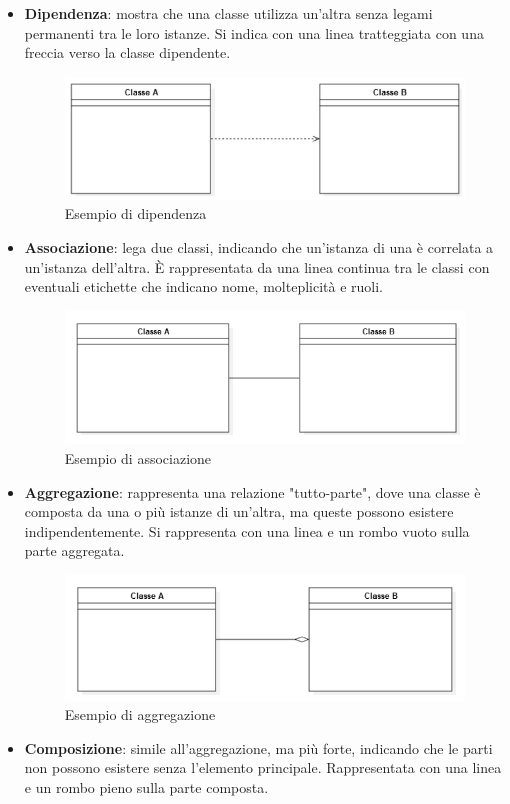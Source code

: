 \begin{itemize}
    \item \textbf{Dipendenza}: mostra che una classe utilizza un'altra senza legami permanenti tra le loro istanze. Si indica con una linea tratteggiata con una freccia verso la classe dipendente.
    \begin{figure}[H]
        \centering
        \includegraphics[width=0.5\linewidth]{../../../img/dipendenza_classi.png}
        \caption{Esempio di dipendenza}
        \label{fig:dipendeza_classi}
    \end{figure}
    \item \textbf{Associazione}: lega due classi, indicando che un'istanza di una è correlata a un'istanza dell'altra. È rappresentata da una linea continua tra le classi con eventuali etichette che indicano nome, molteplicità e ruoli.
    \begin{figure}[H]
        \centering
        \includegraphics[width=0.5\linewidth]{../../../img/associazione_classi.png}
        \caption{Esempio di associazione}
        \label{fig:associazione_classi}
    \end{figure}
    \item \textbf{Aggregazione}: rappresenta una relazione "tutto-parte", dove una classe è composta da una o più istanze di un'altra, ma queste possono esistere indipendentemente. Si rappresenta con una linea e un rombo vuoto sulla parte aggregata.
    \begin{figure}[H]
        \centering
        \includegraphics[width=0.5\linewidth]{../../../img/aggregazione_classi.png}
        \caption{Esempio di aggregazione}
        \label{fig:aggregazione_classi}
    \end{figure}
    \item \textbf{Composizione}: simile all'aggregazione, ma più forte, indicando che le parti non possono esistere senza l'elemento principale. Rappresentata con una linea e un rombo pieno sulla parte composta.

\end{itemize}
